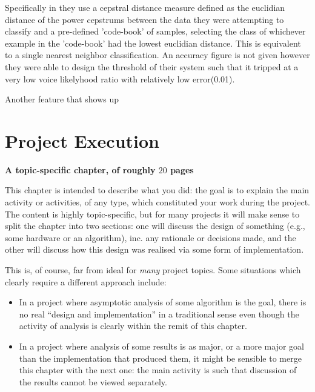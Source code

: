 \documentclass[ %
                    author={Sam Phippen},
                supervisor={Dr. Rafal Bogacz},
                     title={Real time voice activity detectors in noisy personal computing environments},
                  subtitle={},
                    degree={MEng},
                      year={2012} ]{thesis}
\begin{document}
Specifically in \cite{haigh} they use a cepstral distance measure defined as
the euclidian distance of the power cepstrums between the data they were
attempting to classify and a pre-defined 'code-book' of samples, selecting the
class of whichever example in the 'code-book' had the lowest euclidian
distance. This is equivalent to a single nearest neighbor classification. An
accuracy figure is not given however they were able to design the threshold of
their system such that it tripped at a very low voice likelyhood ratio with
relatively low error(0.01).

Another feature that shows up 


\chapter{Project Execution}
\label{chap:execution}

{\bf A topic-specific chapter, of roughly $20$ pages} 
\vspace{1cm} 

\noindent
This chapter is intended to describe what you did: the goal is to explain
the main activity or activities, of any type, which constituted your work 
during the project.  The content is highly topic-specific, but for many 
projects it will make sense to split the chapter into two sections: one 
will discuss the design of something (e.g., some hardware or an algorithm), 
inc. any rationale or decisions made, and the other will discuss how this 
design was realised via some form of implementation.  

This is, of course, far from ideal for {\em many} project topics.  Some
situations which clearly require a different approach include:

\begin{itemize}
\item In a project where asymptotic analysis of some algorithm is the goal,
      there is no real ``design and implementation'' in a traditional sense
      even though the activity of analysis is clearly within the remit of
      this chapter.
\item In a project where analysis of some results is as major, or a more
      major goal than the implementation that produced them, it might be
      sensible to merge this chapter with the next one: the main activity 
      is such that discussion of the results cannot be viewed separately.
\end{itemize}
\end{document}
